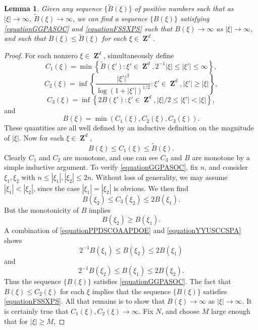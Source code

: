 \documentclass[12pt,reqno]{article}
\numberwithin{equation}{section}
\DeclareMathOperator{\ZZ}{\mathbf{Z}}
\newtheorem{lemma}[theorem]{Lemma}
\begin{document}
\begin{lemma}
    Given any sequence $\{ \tilde{B}(\xi) \}$ of positive numbers such that as $|\xi| \to \infty$, $\tilde{B}(\xi) \to \infty$, we can find a sequence $\{ B(\xi) \}$ satisfying \eqref{equationGGPASOC} and \eqref{equationFSSXPS} such that $B(\xi) \to \infty$ as $|\xi| \to \infty$, and such that $B(\xi) \leq \tilde{B}(\xi)$ for each $\xi \in \ZZ^d$.
\end{lemma}
\begin{proof}
    For each nonzero $\xi \in \ZZ^d$, simultaneously define
    \[ C_1(\xi) = \min \left\{ \tilde{B}(\xi') : \xi' \in \ZZ^d, 2^{-1}|\xi| \leq |\xi'| \leq \infty \right\}, \]
    \[ C_2(\xi) = \inf \left\{ \frac{|\xi'|^\beta}{\log(1 + |\xi'|)^{1/2}} : \xi' \in \ZZ^d, |\xi'| \geq |\xi| \right\}, \]
    \[ C_3(\xi) = \inf \left\{ 2 B(\xi') : \xi' \in \ZZ^d, |\xi|/2 \leq |\xi'| < |\xi| \right\}, \]
    and
    \[ B(\xi) = \min(C_1(\xi), C_2(\xi), C_3(\xi)). \]
    These quantities are all well defined by an inductive definition on the magnitude of $|\xi|$. Now for each $\xi \in \ZZ^d$,
    \[ B(\xi) \leq C_1(\xi) \leq \tilde{B}(\xi). \]
    Clearly $C_1$ and $C_2$ are monotone, and one can see $C_3$ and $B$ are monotone by a simple inductive argument. To verify \eqref{equationGGPASOC}, fix $n$, and consider $\xi_1, \xi_2$ with $n \leq |\xi_1|, |\xi_2| \leq 2n$. Without loss of generality, we may assume $|\xi_1| < |\xi_2|$, since the case $|\xi_1| = |\xi_2|$ is obvious. We then find
    \begin{equation} \label{equationPPDSCOAAPDOE}
        B(\xi_2) \leq C_3(\xi_2) \leq 2 B(\xi_1).
    \end{equation}
    But the monotonicity of $B$ implies
    \begin{equation} \label{equationYYUSCCSPA}
        B(\xi_2) \geq B(\xi_1).
    \end{equation}
    A combination of \eqref{equationPPDSCOAAPDOE} and \eqref{equationYYUSCCSPA} shows
    \[ 2^{-1} B(\xi_1) \leq B(\xi_2) \leq 2 B(\xi_1) \]
    and
    \[ 2^{-1} B(\xi_2) \leq B(\xi_1) \leq 2 B(\xi_2). \]
    Thus the sequence $\{ B(\xi) \}$ satisfies \eqref{equationGGPASOC}. The fact that $B(\xi) \leq C_2(\xi)$ for each $\xi$ implies that the sequence $\{ B(\xi) \}$ satisfies \eqref{equationFSSXPS}. All that remains is to show that $B(\xi) \to \infty$ as $|\xi| \to \infty$. It is certainly true that $C_1(\xi), C_2(\xi) \to \infty$. Fix $N$, and choose $M$ large enough that for $|\xi| \geq M$,

\end{proof}
\end{document}
